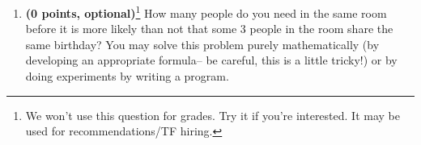 \documentclass[10pt]{article}
\begin{document}
\begin{enumerate}
\item 
{\bf (0 points, optional)}\footnote{We won't use this question for grades. Try it if you're interested. It may be used for recommendations/TF hiring.}
How many people do you need in the same room before it is more
likely than not that some 3 people in the room share the same
birthday?  You may solve this problem purely mathematically (by
developing an appropriate formula-- be careful, this is a little
tricky!) or by doing experiments by writing a program.









\end{enumerate}
\end{document}
